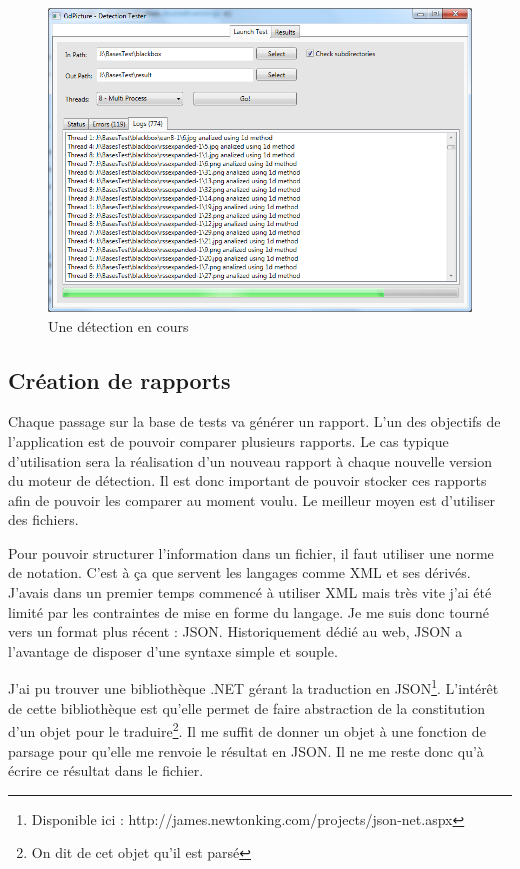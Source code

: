 \begin{figure}
\begin{center}
\includegraphics[scale=0.6]{images/projet1DetectionWindow.png}
\caption{Une détection en cours}
\end{center}
\end{figure}

\subsection{Création de rapports}

Chaque passage sur la base de tests va générer un rapport. L'un des objectifs de l'application est de pouvoir comparer plusieurs rapports. Le cas typique d'utilisation sera la réalisation d'un nouveau rapport à chaque nouvelle version du moteur de détection. Il est donc important de pouvoir stocker ces rapports afin de pouvoir les comparer au moment voulu. Le meilleur moyen est d'utiliser des fichiers.

Pour pouvoir structurer l'information dans un fichier, il faut utiliser une norme de notation. C'est à ça que servent les langages comme XML et ses dérivés. J'avais dans un premier temps commencé à utiliser XML mais très vite j'ai été limité par les contraintes de mise en forme du langage. Je me suis donc tourné vers un format plus récent : JSON. Historiquement dédié au web, JSON a l'avantage de disposer d'une syntaxe simple et souple.

J'ai pu trouver une bibliothèque .NET gérant la traduction en JSON\footnote{Disponible ici : http://james.newtonking.com/projects/json-net.aspx}. L'intérêt de cette bibliothèque est qu'elle permet de faire abstraction de la constitution d'un objet pour le traduire\footnote{On dit de cet objet qu'il est \og parsé \fg{} }. Il me suffit de donner un objet à une fonction de parsage pour qu'elle me renvoie le résultat en JSON. Il ne me reste donc qu'à écrire ce résultat dans le fichier.

